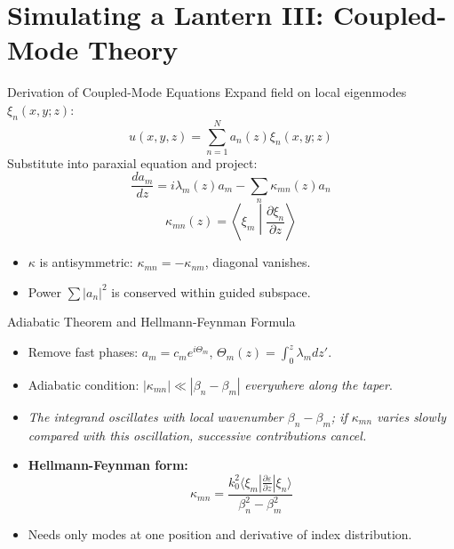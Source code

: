 \documentclass[aspectratio=169,10pt]{beamer}
\begin{document}
\section{Simulating a Lantern III: Coupled-Mode Theory}
\begin{frame}{Derivation of Coupled-Mode Equations}
Expand field on local eigenmodes \(\xi_n(x,y;z)\):
\[
    u(x,y,z) = \sum_{n=1}^{N} a_n(z) \xi_n(x,y;z)
\]
Substitute into paraxial equation and project:
\[
    \frac{d a_m}{d z} = i \lambda_m(z) a_m - \sum_n \kappa_{mn}(z) a_n
\]
\[
    \kappa_{mn}(z) = \left\langle \xi_m \middle| \frac{\partial \xi_n}{\partial z} \right\rangle
\]
\begin{itemize}
    \item \(\kappa\) is antisymmetric: \(\kappa_{mn} = -\kappa_{nm}\), diagonal vanishes.
    \item Power \(\sum |a_n|^2\) is conserved within guided subspace.
\end{itemize}
\end{frame}

\begin{frame}{Adiabatic Theorem and Hellmann-Feynman Formula}
\begin{itemize}
    \item Remove fast phases: \(a_m = c_m e^{i \Theta_m}\), \(\Theta_m(z) = \int_0^z \lambda_m dz'\).
    \item Adiabatic condition: \(|\kappa_{mn}| \ll |\beta_n - \beta_m|\) \emph{everywhere along the taper}.
    \item \emph{The integrand oscillates with local wavenumber $\beta_n - \beta_m$; if $\kappa_{mn}$ varies slowly compared with this oscillation, successive contributions cancel.}
    \item \textbf{Hellmann-Feynman form:}
    \[
        \kappa_{mn} = \frac{k_0^2 \langle \xi_m | \frac{\partial \varepsilon}{\partial z} | \xi_n \rangle}{\beta_n^2 - \beta_m^2}
    \]
    \item Needs only modes at one position and derivative of index distribution.
\end{itemize}
\end{frame}
\end{document}
